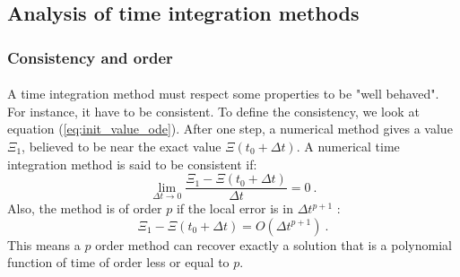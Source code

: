     \subsection{Analysis of time integration methods}

      \subsubsection{Consistency and order}

        \paragraph{}
        A time integration method must respect some properties to be "well behaved".
        For instance, it have to be consistent.
        To define the consistency, we look at equation (\ref{eq:init_value_ode}).
        After one step, a numerical method gives a value $\Xi_1$, believed to be near the exact value $\Xi\left(t_0 + \Delta t\right)$.
        A numerical time integration method is said to be consistent if:
        \begin{equation}
          \lim_{\Delta t \rightarrow 0} \frac{\Xi_1 - \Xi\left(t_0 + \Delta t\right)}{\Delta t} = 0 \ .
        \end{equation}
        Also, the method is of order $p$ if the local error is in $\Delta t^{p+1}$ \cite{Iserles2008}:
        \begin{equation}
          \Xi_1 - \Xi\left(t_0 + \Delta t\right) = O\left(\Delta t^{p+1}\right) \ .
        \end{equation}
        This means a $p$ order method can recover exactly a solution that is a polynomial function of time of order less or equal to $p$.


